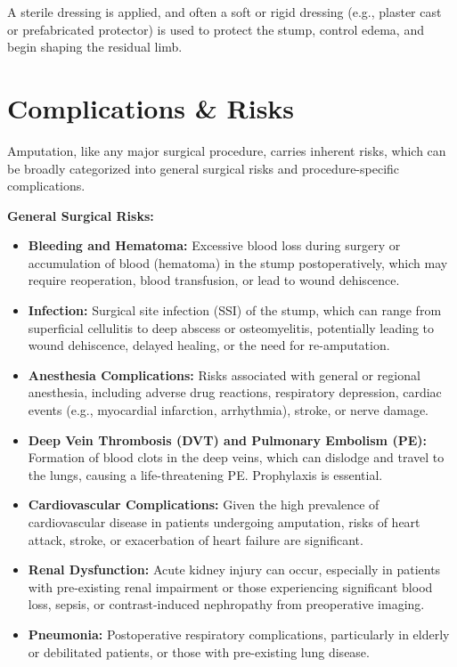 A sterile dressing is applied, and often a soft or rigid dressing (e.g., plaster cast or prefabricated protector) is used to protect the stump, control edema, and begin shaping the residual limb.

\section*{Complications \& Risks}
Amputation, like any major surgical procedure, carries inherent risks, which can be broadly categorized into general surgical risks and procedure-specific complications.

\textbf{General Surgical Risks:}
\begin{itemize}
  \item \textbf{Bleeding and Hematoma:} Excessive blood loss during surgery or accumulation of blood (hematoma) in the stump postoperatively, which may require reoperation, blood transfusion, or lead to wound dehiscence.
  \item \textbf{Infection:} Surgical site infection (SSI) of the stump, which can range from superficial cellulitis to deep abscess or osteomyelitis, potentially leading to wound dehiscence, delayed healing, or the need for re-amputation.
  \item \textbf{Anesthesia Complications:} Risks associated with general or regional anesthesia, including adverse drug reactions, respiratory depression, cardiac events (e.g., myocardial infarction, arrhythmia), stroke, or nerve damage.
  \item \textbf{Deep Vein Thrombosis (DVT) and Pulmonary Embolism (PE):} Formation of blood clots in the deep veins, which can dislodge and travel to the lungs, causing a life-threatening PE. Prophylaxis is essential.
  \item \textbf{Cardiovascular Complications:} Given the high prevalence of cardiovascular disease in patients undergoing amputation, risks of heart attack, stroke, or exacerbation of heart failure are significant.
  \item \textbf{Renal Dysfunction:} Acute kidney injury can occur, especially in patients with pre-existing renal impairment or those experiencing significant blood loss, sepsis, or contrast-induced nephropathy from preoperative imaging.
  \item \textbf{Pneumonia:} Postoperative respiratory complications, particularly in elderly or debilitated patients, or those with pre-existing lung disease.
\end{itemize}

